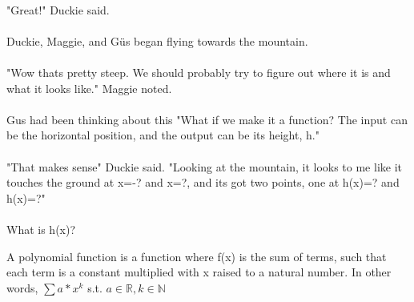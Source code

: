 \paragraph{} "Great!" Duckie said. 
\vfill
\pagebreak
{}
{\paragraph{} Duckie, Maggie, and G{\"u}s began flying towards the mountain. 
\paragraph{} "Wow thats pretty steep. We should probably try to figure out where it is and what it looks like." Maggie noted. 
\paragraph{} Gus had been thinking about this "What if we make it a function? The input can be the horizontal position, and the output can be its height, h."
\paragraph{} "That makes sense" Duckie said. "Looking at the mountain, it looks to me like it touches the ground at x=-? and x=?, and its got two points, one at h(x)=? and h(x)=?" 
\paragraph{} What is h(x)?}
{}
{A polynomial function is a function where f(x) is the sum of terms, such that each term is a constant multiplied with x raised to a natural number. In other words, $\sum a*x^{k}$ s.t. $a \in \mathbb{R}, k \in \mathbb{N}$}
{}